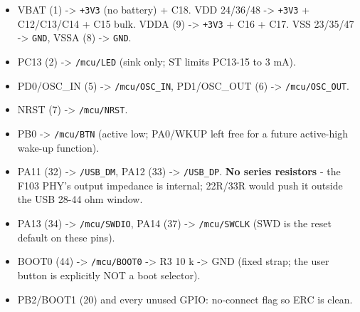 \documentclass[11pt,a4paper]{article}
\begin{document}
\begin{itemize}
\item VBAT (1) -\textgreater{} \texttt{+3V3} (no battery) + C18. VDD 24/36/48 -\textgreater{} \texttt{+3V3} + C12/C13/C14
+ C15 bulk. VDDA (9) -\textgreater{} \texttt{+3V3} + C16 + C17. VSS 23/35/47 -\textgreater{} \texttt{GND},
VSSA (8) -\textgreater{} \texttt{GND}.
\item PC13 (2) -\textgreater{} \texttt{/mcu/LED} (sink only; ST limits PC13-15 to 3 mA).
\item PD0/OSC\_IN (5) -\textgreater{} \texttt{/mcu/OSC\_IN}, PD1/OSC\_OUT (6) -\textgreater{} \texttt{/mcu/OSC\_OUT}.
\item NRST (7) -\textgreater{} \texttt{/mcu/NRST}.
\item PB0 -\textgreater{} \texttt{/mcu/BTN} (active low; PA0/WKUP left free for a future active-high
wake-up function).
\item PA11 (32) -\textgreater{} \texttt{/USB\_DM}, PA12 (33) -\textgreater{} \texttt{/USB\_DP}. \textbf{No series resistors} -
the F103 PHY's output impedance is internal; 22R/33R would push it outside
the USB 28-44 ohm window.
\item PA13 (34) -\textgreater{} \texttt{/mcu/SWDIO}, PA14 (37) -\textgreater{} \texttt{/mcu/SWCLK} (SWD is the reset
default on these pins).
\item BOOT0 (44) -\textgreater{} \texttt{/mcu/BOOT0} -\textgreater{} R3 10 k -\textgreater{} GND (fixed strap; the user button
is explicitly NOT a boot selector).
\item PB2/BOOT1 (20) and every unused GPIO: no-connect flag so ERC is clean.
\end{itemize}
\end{document}
